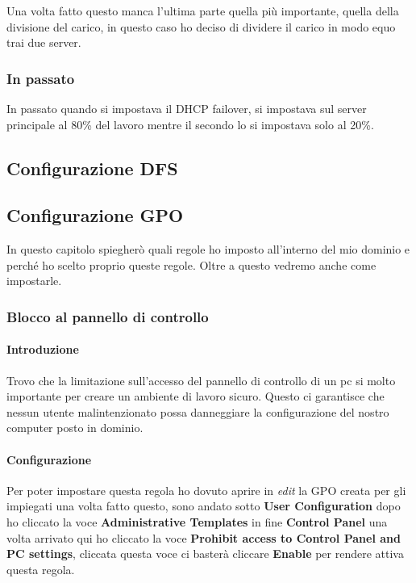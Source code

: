 \documentclass[../main.tex]{subfiles}
\begin{document}
Una volta fatto questo manca l'ultima parte quella più importante, quella della divisione del carico, in questo caso ho deciso di dividere il carico in modo equo trai due server.



\subsubsection{In passato }
In passato quando si impostava il DHCP failover, si impostava sul server principale al 80\% del lavoro mentre il secondo lo si impostava solo al 20\%.


\pagebreak{}
\thispagestyle{header-pages}
\subsection{Configurazione DFS}

\pagebreak{}
\thispagestyle{header-pages}
\subsection{Configurazione GPO}

In questo capitolo spiegherò quali regole ho imposto all'interno del mio dominio e perché ho scelto proprio queste regole. Oltre a questo vedremo anche come impostarle.

\subsubsection{Blocco al pannello di controllo}
\paragraph{Introduzione}
Trovo che la limitazione sull'accesso del pannello di controllo di un pc si molto importante per creare un ambiente di lavoro sicuro. Questo ci garantisce che nessun utente malintenzionato possa danneggiare la configurazione del nostro computer posto in dominio.


\paragraph{Configurazione}
Per poter impostare questa regola ho dovuto aprire in \textit{edit} la GPO creata per gli impiegati una volta fatto questo, sono andato sotto \textbf{User Configuration} dopo ho cliccato la voce \textbf{Administrative Templates} in fine \textbf{Control Panel} una volta arrivato qui ho cliccato la voce \textbf{Prohibit access to Control Panel and PC settings}, cliccata questa voce ci basterà cliccare \textbf{Enable} per rendere attiva questa regola.
\end{document}
